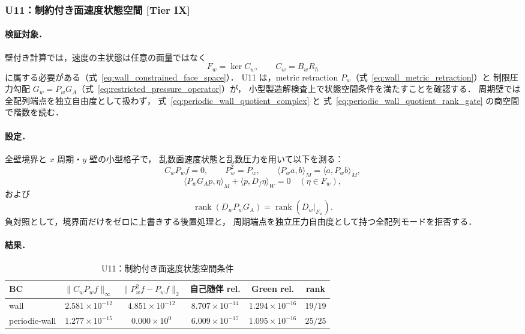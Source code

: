 %
\subsubsection{U11：制約付き面速度状態空間 [Tier IX]}
\label{sec:U11_constrained_face_state_space}

\paragraph{検証対象．}
壁付き計算では，速度の主状態は任意の面量ではなく
\[
  F_w=\ker C_w,\qquad C_w=B_wR_h
\]
に属する必要がある（式~\eqref{eq:wall_constrained_face_space}）．
U11 は，metric retraction $P_w$（式~\eqref{eq:wall_metric_retraction}）と
制限圧力勾配 $G_w=P_wG_A$（式~\eqref{eq:restricted_pressure_operator}）が，
小型製造解検査上で状態空間条件を満たすことを確認する．
周期壁では全配列端点を独立自由度として扱わず，
式~\eqref{eq:periodic_wall_quotient_complex} と
式~\eqref{eq:periodic_wall_quotient_rank_gate} の商空間で階数を読む．

\paragraph{設定．}
全壁境界と $x$ 周期・$y$ 壁の小型格子で，
乱数面速度状態と乱数圧力を用いて以下を測る：
\[
  C_wP_w f=0,\qquad P_w^2=P_w,\qquad
  \langle P_wa,b\rangle_M=\langle a,P_wb\rangle_M,
\]
\[
  \langle P_wG_Ap,\eta\rangle_M+\langle p,D_f\eta\rangle_W=0
  \quad(\eta\in F_w),
\]
および
\[
  \operatorname{rank}(D_wP_wG_A)=\operatorname{rank}(D_w|_{F_w}) .
\]
負対照として，境界面だけをゼロに上書きする後置処理と，
周期端点を独立圧力自由度として持つ全配列モードを拒否する．

\paragraph{結果．}

\begin{table}[!ht]
\caption{U11：制約付き面速度状態空間条件}
\label{tab:U11_constrained_face_state_space}
\centering\small
\begin{tabular}{l c c c c c}
\toprule
BC & $\|C_wP_wf\|_\infty$ & $\|P_w^2f-P_wf\|_2$ & 自己随伴 rel. & Green rel. & rank \\
\midrule
wall & $2.581\times10^{-12}$ & $4.851\times10^{-12}$ & $8.707\times10^{-14}$ & $1.294\times10^{-16}$ & $19/19$ \\
periodic-wall & $1.277\times10^{-15}$ & $0.000\times10^{0}$ & $6.009\times10^{-17}$ & $1.095\times10^{-16}$ & $25/25$ \\
\bottomrule
\end{tabular}
\end{table}

